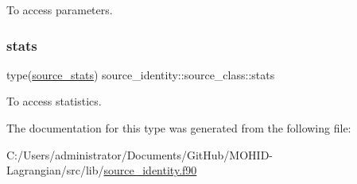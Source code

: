 To access parameters. 

\mbox{\label{structsource__identity_1_1source__class_a630571a5e588a6ced99787b473bf5e2f}} 
\subsubsection{\texorpdfstring{stats}{stats}}
{\footnotesize\ttfamily type(\mbox{\hyperlink{structsource__identity_1_1source__stats}{source\+\_\+stats}}) source\+\_\+identity\+::source\+\_\+class\+::stats\hspace{0.3cm}{\ttfamily [private]}}



To access statistics. 



The documentation for this type was generated from the following file\+:\begin{DoxyCompactItemize}
\item 
C\+:/\+Users/administrator/\+Documents/\+Git\+Hub/\+M\+O\+H\+I\+D-\/\+Lagrangian/src/lib/\mbox{\hyperlink{source__identity_8f90}{source\+\_\+identity.\+f90}}\end{DoxyCompactItemize}
